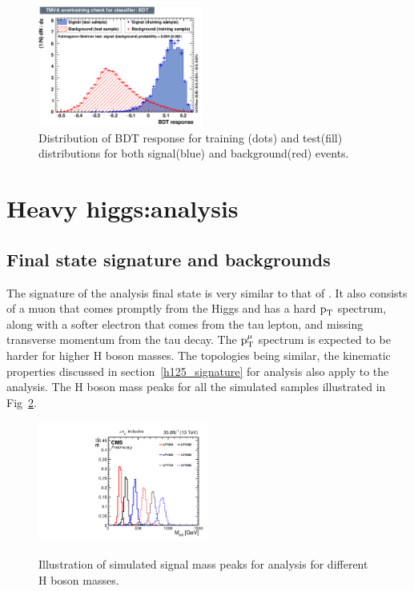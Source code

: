 \begin{figure}[htpb]
\begin{center}
\includegraphics[width=0.48\textwidth]{plots_and_figures/chapter5/overtrain_BDT.pdf}
\end{center}
\caption{Distribution of BDT response for training (dots) and test(fill) distributions for both signal(blue) and background(red) events.}
\label{fig:BDT_response}
\end{figure}

\section{Heavy higgs:\Hmue analysis}

\subsection{Final state signature and backgrounds}
The signature of the \Hmue analysis final state is very similar to that of \hmue. It also consists of a muon that comes promptly from the Higgs and has a hard $\text{p}_\text{T}$ spectrum, along with a softer electron that comes from the tau lepton, and missing transverse momentum from the tau decay. The $\text{p}_\text{T}^{\mu}$ spectrum is expected to be harder for higher H boson masses. The topologies being similar, the kinematic properties discussed in section~\ref{h125_signature} for \hmue analysis also apply to the \Hmue analysis. The H boson mass peaks for all the simulated samples illustrated in Fig~\ref{fig:sig_peaks}.


\begin{figure}[htbp]
     \centering
     \includegraphics[width=0.5\textwidth]{plots_and_figures/chapter5/HM_signals_only_colmass.pdf}\\
     \caption{Illustration of simulated signal mass peaks for \Hmue analysis for different H boson masses.}
     \label{fig:sig_peaks}
\end{figure}

